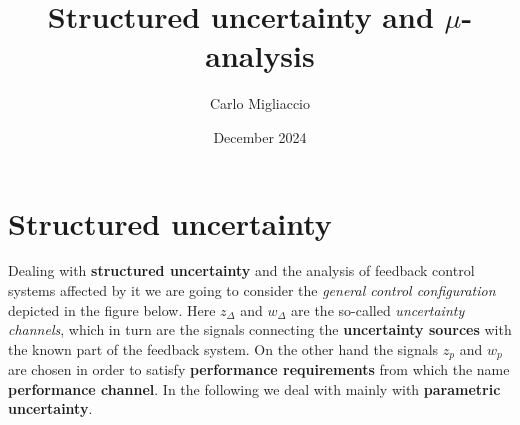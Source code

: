 \documentclass[a4paper, 12pt]{article}
\title{\textbf{Structured uncertainty and $\mu$-analysis}}
\author{Carlo Migliaccio
}
\date{December 2024}
\begin{document}
\maketitle

\section{Structured uncertainty}
Dealing with \textbf{structured uncertainty} and the analysis of feedback control systems affected by it we are going to consider the \textit{general control configuration} depicted in the figure below.
Here $z_\Delta$ and $w_\Delta$ are the so-called \textit{uncertainty channels}, which in turn are the signals connecting the \textbf{uncertainty sources} with the known part of the feedback system. On the other hand the signals $z_p$ and $w_p$ are chosen in order to satisfy \textbf{performance requirements} from which the name \textbf{performance channel}. In the following we deal with mainly with \textbf{parametric uncertainty}.
\end{document}
